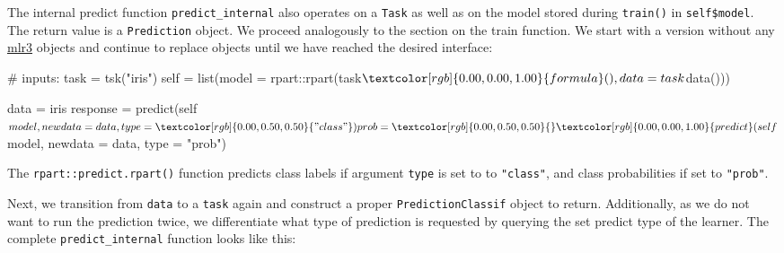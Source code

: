 \documentclass[
  11pt,
  parskip=half,
  DIV=calc,
  BCOR=10mm,
  x11names]{scrbook}
\newenvironment{Shaded}{}{}
\newcommand{\CommentTok}[1]{\textcolor[rgb]{0.00,0.50,0.00}{#1}}
\newcommand{\DataTypeTok}[1]{#1}
\newcommand{\KeywordTok}[1]{\textcolor[rgb]{0.00,0.00,1.00}{#1}}
\newcommand{\NormalTok}[1]{#1}
\newcommand{\OperatorTok}[1]{#1}
\newcommand{\StringTok}[1]{\textcolor[rgb]{0.00,0.50,0.50}{#1}}
\begin{document}
The internal predict function \texttt{predict\_internal} also operates on a \texttt{Task} as well as on the model stored during \texttt{train()} in \texttt{self\$model}.
The return value is a \texttt{Prediction} object.
We proceed analogously to the section on the train function.
We start with a version without any \href{https://mlr3.mlr-org.com}{mlr3} objects and continue to replace objects until we have reached the desired interface:

\begin{Shaded}
\begin{Highlighting}[]
\CommentTok{# inputs:}
\NormalTok{task =}\StringTok{ }\KeywordTok{tsk}\NormalTok{(}\StringTok{"iris"}\NormalTok{)}
\NormalTok{self =}\StringTok{ }\KeywordTok{list}\NormalTok{(}\DataTypeTok{model =}\NormalTok{ rpart}\OperatorTok{::}\KeywordTok{rpart}\NormalTok{(task}\OperatorTok{$}\KeywordTok{formula}\NormalTok{(), }\DataTypeTok{data =}\NormalTok{ task}\OperatorTok{$}\KeywordTok{data}\NormalTok{()))}

\NormalTok{data =}\StringTok{ }\NormalTok{iris}
\NormalTok{response =}\StringTok{ }\KeywordTok{predict}\NormalTok{(self}\OperatorTok{$}\NormalTok{model, }\DataTypeTok{newdata =}\NormalTok{ data, }\DataTypeTok{type =} \StringTok{"class"}\NormalTok{)}
\NormalTok{prob =}\StringTok{ }\KeywordTok{predict}\NormalTok{(self}\OperatorTok{$}\NormalTok{model, }\DataTypeTok{newdata =}\NormalTok{ data, }\DataTypeTok{type =} \StringTok{"prob"}\NormalTok{)}
\end{Highlighting}
\end{Shaded}

The \texttt{rpart::predict.rpart()} function predicts class labels if argument \texttt{type} is set to to \texttt{"class"}, and class probabilities if set to \texttt{"prob"}.

Next, we transition from \texttt{data} to a \texttt{task} again and construct a proper \texttt{PredictionClassif} object to return.
Additionally, as we do not want to run the prediction twice, we differentiate what type of prediction is requested by querying the set predict type of the learner.
The complete \texttt{predict\_internal} function looks like this:
\end{document}

